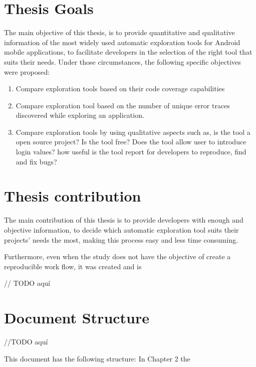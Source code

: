 \section{Thesis  Goals}\label{sec:thesisGoals}

The main objective of this thesis, is to provide quantitative and qualitative information of the most widely used automatic exploration tools for Android mobile applications, to facilitate developers in the selection of the right tool that suits their needs. Under those circumstances, the following specific objectives were proposed:
		\begin{enumerate}
			\item Compare exploration tools  based on their code  coverage capabilities
			\item Compare exploration tool based on the number of unique error traces discovered while exploring an application.
			\item Compare exploration tools by using qualitative aspects such as, is the tool a open source project? Is the tool free? Does the tool allow user to introduce login values? how useful is the tool report for developers to reproduce, find and fix bugs?
		\end{enumerate}

\section{Thesis contribution} \label{sec:thesisContribution}

The main contribution of this thesis is to provide developers with enough and objective information, to decide which automatic exploration tool suits their projects' needs the most, making this process easy and less time consuming.

Furthermore, even when the study does not have the objective of create a reproducible work flow, it was created and is 


// TODO aquí

	
\section{Document Structure}
//TODO aquí

This document has the following structure: In Chapter 2 the 


